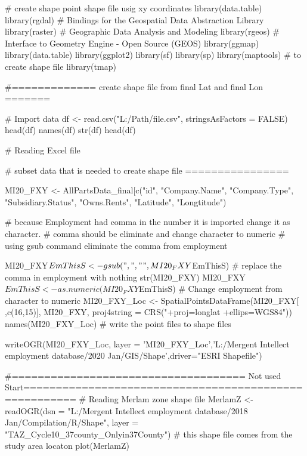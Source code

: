 # create shape point shape file usig xy coordinates
library(data.table)
library(rgdal) # Bindings for the Geospatial Data Abstraction Library
library(raster) # Geographic Data Analysis and Modeling
library(rgeos) # Interface to Geometry Engine - Open Source (GEOS)
library(ggmap)
library(data.table)
library(ggplot2)
library(sf)
library(sp)
library(maptools) # to create shape file
library(tmap)

#============= create shape file from final Lat and final Lon =======
 
# Import data 
df <- read.csv("L:/Path/file.csv", stringsAsFactors = FALSE)
head(df)
names(df)
str(df)
head(df)

# Reading Excel file
 
 
 
 

# subset data that is needed to create shape file ================

MI20_FXY <- AllPartsData_final[c("id",
                                             "Company.Name",
                                             "Company.Type",
                                             "Subsidiary.Status",
                                             "Owns.Rents",
                                             "Latitude",
                                             "Longtitude")




# because Employment had comma in the number it is imported change it as character.
# comma should be eliminate and change character to numeric
# using gsub command eliminate the comma from employment 

MI20_FXY$EmThisS <- gsub(",", "",MI20_FXY$EmThisS) # replace the comma in employment with nothing
str(MI20_FXY)
MI20_FXY$EmThisS <- as.numeric(MI20_FXY$EmThisS) # Change employment from character to numeric
MI20_FXY_Loc <- SpatialPointsDataFrame(MI20_FXY[ ,c(16,15)], MI20_FXY,
                                   proj4string = CRS("+proj=longlat +ellips=WGS84"))
names(MI20_FXY_Loc)
# write the point files to shape files

writeOGR(MI20_FXY_Loc, layer = 'MI20_FXY_Loc','L:/Mergent Intellect employment database/2020 Jan/GIS/Shape',driver="ESRI Shapefile")


#==================================== Not used Start======================================================
# Reading Merlam zone shape file 
MerlamZ <- readOGR(dsn = "L:/Mergent Intellect employment database/2018 Jan/Compilation/R/Shape", layer = "TAZ_Cycle10_37county_Onlyin37County") # this shape file comes from the study area locaton 
plot(MerlamZ)

